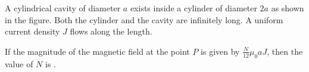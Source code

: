 
\item A cylindrical cavity of diameter \( a \) exists inside a cylinder of diameter \( 2a \) as shown in the figure. Both the cylinder and the cavity are infinitely long. A uniform current density \( J \) flows along the length.

If the magnitude of the magnetic field at the point \( P \) is given by \(\frac{N}{12} \mu_0 aJ \), then the value of \( N \) is \underline{\hspace{2.5cm}}.
    \begin{center}
    \end{center}
